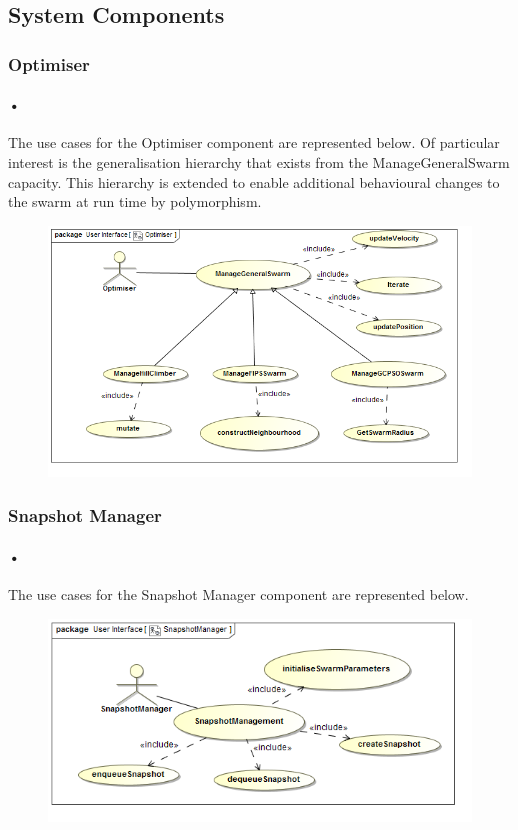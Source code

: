 \documentclass[11pt]{article}
\begin{document}
\subsection{System Components}
\subsubsection{Optimiser}
\paragraph{•}
The use cases for the Optimiser component are represented below.
Of particular interest is the generalisation hierarchy that exists from the ManageGeneralSwarm capacity. This hierarchy is extended to enable additional behavioural changes to the swarm at run time by polymorphism.
\begin{figure}[H]
	\includegraphics[scale=0.50]{Optimiser.png}
\end{figure}

\subsubsection{Snapshot Manager}
\paragraph{•}
The use cases for the Snapshot Manager component are represented below.
\begin{figure}[H]
	\includegraphics[scale=0.55]{SnapshotManager.png}
\end{figure}
\end{document}
